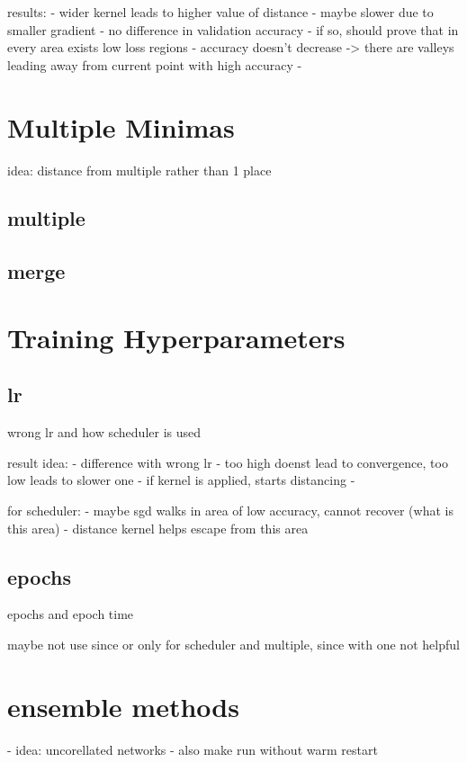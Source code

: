 results: - wider kernel leads to higher value of
distance - maybe slower due to smaller gradient - no difference in validation
accuracy - if so, should prove that in every area exists low loss regions -
accuracy doesn't decrease -> there are valleys leading away from current point
with high accuracy - 







\section{Multiple Minimas}\label{res:Multiple}
idea: distance from multiple rather than 1 place
\subsection{multiple}
\subsection{merge}

\section{Training Hyperparameters}\label{res:Training}
\subsection{lr}\label{res:Learning rate}    
wrong lr and how scheduler is used

result idea:
- difference with wrong lr
- too high doenst lead to convergence, too low leads to slower one
- if kernel is applied, starts distancing
- 


for scheduler:
- maybe sgd walks in area of low accuracy, cannot recover (what is this area)
- distance kernel helps escape from this area


\subsection{epochs}\label{res:Epochs}
epochs and epoch time

maybe not use since or only for scheduler and multiple, since with one not helpful

\section{ensemble methods}
- idea: uncorellated networks
- also make run without warm restart

